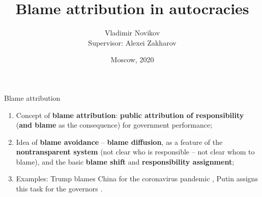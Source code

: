 \documentclass{beamer}
\title{Blame attribution in autocracies}
\author[]{Vladimir Novikov\\{\small Supervisor: Alexei Zakharov}}
\institute[]{National Research University Higher School of Economics}
\date{Moscow, 2020}
\begin{document}

\begin{frame}
    
    \maketitle
    
\end{frame}

\begin{frame}{Blame attribution}
    \begin{enumerate}
    
        
    
        \item Concept of \textbf{blame attribution}: \textbf{public attribution of responsibility} (\textbf{and blame} as the consequence) for government performance;
        
        \item Idea of \textbf{blame avoidance} -- \textbf{blame diffusion}, as a feature of the \textbf{nontransparent system} (not clear who is responsible -- not clear whom to blame), and the basic \textbf{blame shift} and \textbf{responsibility assignment};
        
        \item Examples: Trump blames China for the coronavirus pandemic \parencite{trumpcorona}, Putin assigns this task for the governors \parencite{putincorona}.
        
    \end{enumerate}

\end{frame}
\end{document}

